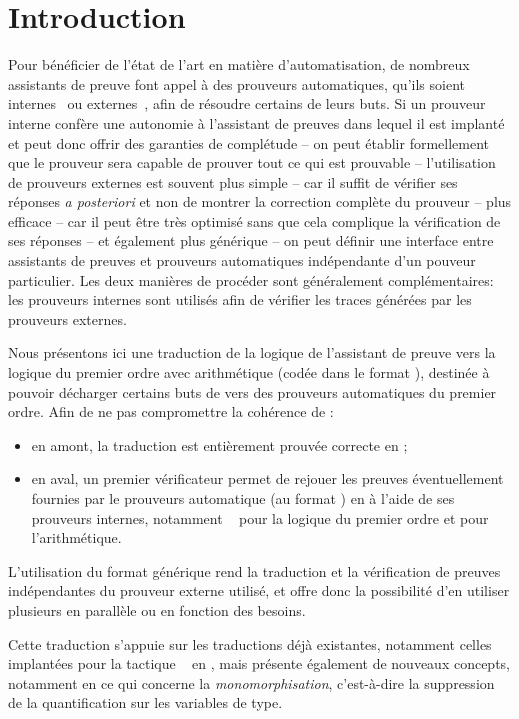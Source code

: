 \section{Introduction}

Pour bénéficier de l'état de l'art en matière d'automatisation, de
nombreux assistants de preuve font appel à des prouveurs automatiques,
qu'ils soient internes~\cite{Hurd05,Lescuyer11} ou
externes~\cite{Paulson10,DBLP:conf/cpp/ArmandFGKTW11}, afin de résoudre
certains de leurs buts. Si un prouveur interne confère une autonomie à
l'assistant de preuves dans lequel il est implanté et peut donc offrir
des garanties de complétude -- on peut établir formellement que le
prouveur sera capable de prouver tout ce qui est prouvable --
l'utilisation de prouveurs externes est souvent plus simple -- car il
suffit de vérifier ses réponses \emph{a posteriori} et non de montrer la
correction complète du prouveur -- plus efficace -- car il peut être
très optimisé sans que cela complique la vérification de ses réponses --
et également plus générique -- on peut définir une interface entre
assistants de preuves et prouveurs automatiques indépendante d'un
pouveur particulier. Les deux manières de procéder sont généralement
complémentaires: les prouveurs internes sont utilisés afin de vérifier
les traces générées par les prouveurs externes.

Nous présentons ici une traduction de la logique de l'assistant de
preuve \holfour vers la logique du premier ordre avec arithmétique
(codée dans le format \tff), destinée à pouvoir décharger certains buts
de \holfour vers des prouveurs automatiques du premier ordre. Afin de ne
pas compromettre la cohérence de \holfour:
\begin{itemize}
\item en amont, la traduction est entièrement prouvée correcte en
  \holfour;
\item en aval, un premier vérificateur permet de rejouer les preuves
  éventuellement fournies par le prouveurs automatique (au format \tff)
  en \holfour à l'aide de ses prouveurs internes, notamment
  \metis~\cite{Hurd05} pour la logique du premier ordre et \cooper pour
  l'arithmétique.
\end{itemize}
L'utilisation du format \tff générique rend la traduction et la
vérification de preuves indépendantes du prouveur externe utilisé, et
offre donc la possibilité d'en utiliser plusieurs en parallèle ou en
fonction des besoins.

Cette traduction s'appuie sur les traductions déjà existantes, notamment
celles implantées pour la tactique \sledgehammer~\cite{Paulson10} en
\isabellehol, mais présente également de nouveaux concepts, notamment en
ce qui concerne la \emph{monomorphisation}, c'est-à-dire la suppression
de la quantification sur les variables de type.

